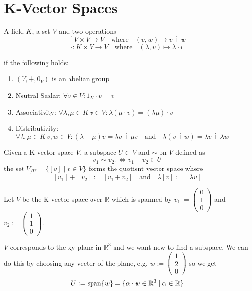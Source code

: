 \section{K-Vector Spaces}
\begin{definition}\label{def:vector_spaces}
   A field \(K\), a set \(V\) and two operations
   \[\dotplus V \times V \to V \quad\text{where}\quad (v, w) \mapsto v \dotplus w\]
   \[\cdot: K \times V \to V \quad\text{where}\quad (\lambda, v) \mapsto \lambda \cdot v\]

   if the following holds:
   \begin{enumerate}[label=\roman*, align=Center]
      \item \((V, \dotplus, 0_V)\) is an abelian group
      \item Neutral Scalar: \(\forall v \in V: 1_K \cdot v = v\)
      \item Associativity: \(\forall \lambda, \mu \in K~v \in V: \lambda (\mu \cdot v) = (\lambda \mu) \cdot v\)
      \item Distributivity: \(\forall \lambda, \mu \in K~v, w \in V: (\lambda + \mu) v = \lambda v \dotplus \mu v \quad\text{and}\quad \lambda (v \dotplus w) = \lambda v \dotplus \lambda w\)
   \end{enumerate}
\end{definition}

\begin{definition}
   Given a K-vector space \(V\), a subspace \(U \subset V\) and \(\sim\) on \(V\) defined as
   \[v_1 \sim v_2 :\iff v_1 - v_2 \in U\]
   the set \(V_{/U} = \{[v] \mid v \in V\}\) forms the quotient vector space where
   \[[v_1] + [v_2] := [v_1 + v_2] \quad\text{and}\quad \lambda [v] := [\lambda v]\]
\end{definition}
\begin{example}
   Let \(V\) be the K-vector space over \(\mathbb{R}\) which is spanned by \(v_1 := \begin{pmatrix}0\\1\\0\end{pmatrix}\) and \(v_2 := \begin{pmatrix}1\\1\\0\end{pmatrix}\).

   \(V\) corresponds to the xy-plane in \(\mathbb{R}^3\) and we want now to find a subspace.
   We can do this by choosing any vector of the plane, e.g. \(w := \begin{pmatrix}1\\2\\0\end{pmatrix}\) so we get
   \[U := \operatorname{span}\{w\} = \{\alpha \cdot w \in \mathbb{R}^3 \mid \alpha \in \mathbb{R}\}\]
\end{example}


